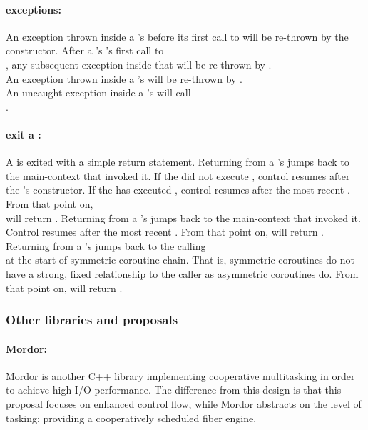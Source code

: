 \paragraph*{exceptions:}
An exception thrown inside a \pullcoro's \corofunction before its first call to
\pushcoroop will be re-thrown by the \pullcoro constructor. After a \pullcoro's
\corofunction's first call to\\
\pushcoroop, any subsequent exception inside that \corofunction will be
re-thrown by \pullcoroop.\\
\newline
An exception thrown inside a \pushcoro's \corofunction will be re-thrown by
\pushcoroop.\\
\newline
An uncaught exception inside a \callcoro's \corofunction will call\\
.

\paragraph*{exit a \corofunction:}
A \corofunction is exited with a simple return statement.
\newline
Returning from a \pullcoro's \corofunction jumps back to the main-context that
invoked it. If the \corofunction did not execute \pushcoroop, control resumes
after the \pullcoro's constructor. If the \corofunction has
executed \pushcoroop, control resumes after the most recent \pullcoroop. From
that point on,\\
\pullcorobool will return .
\newline
Returning from a \pushcoro's \corofunction jumps back to the main-context that
invoked it. Control resumes after the most recent \pushcoroop. From that point
on, \pushcorobool will return .
\newline
Returning from a \callcoro's \corofunction jumps back to the calling\\
\callcoroop at the start of symmetric coroutine chain. That is,
symmetric coroutines do not have a strong, fixed relationship to the caller as
asymmetric coroutines do. From that point on, \callcorobool will
return .


\subsubsection*{Other libraries and proposals}
\paragraph*{Mordor:}
Mordor\cite{mordor} is another C++ library implementing cooperative multitasking
in order to achieve high I/O performance. The difference from this design is
that this proposal focuses on enhanced control flow, while Mordor\cite{mordor}
abstracts on the level of tasking: providing a cooperatively scheduled fiber
engine.

